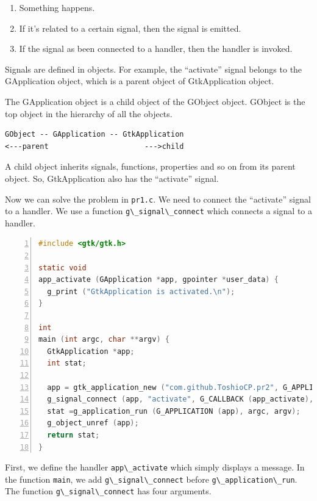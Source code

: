 \begin{enumerate}
\def\labelenumi{\arabic{enumi}.}
\tightlist
\item
  Something happens.
\item
  If it's related to a certain signal, then the signal is emitted.
\item
  If the signal as been connected to a handler, then the handler is
  invoked.
\end{enumerate}

Signals are defined in objects. For example, the ``activate'' signal
belongs to the GApplication object, which is a parent object of
GtkApplication object.

The GApplication object is a child object of the GObject object. GObject
is the top object in the hierarchy of all the objects.

\begin{lstlisting}
GObject -- GApplication -- GtkApplication
<---parent                      --->child
\end{lstlisting}

A child object inherits signals, functions, properties and so on from
its parent object. So, GtkApplication also has the ``activate'' signal.

Now we can solve the problem in \passthrough{\lstinline!pr1.c!}. We need
to connect the ``activate'' signal to a handler. We use a function
\passthrough{\lstinline!g\_signal\_connect!} which connects a signal to
a handler.

\begin{lstlisting}[language=C, numbers=left]
#include <gtk/gtk.h>

static void
app_activate (GApplication *app, gpointer *user_data) {
  g_print ("GtkApplication is activated.\n");
}

int
main (int argc, char **argv) {
  GtkApplication *app;
  int stat;

  app = gtk_application_new ("com.github.ToshioCP.pr2", G_APPLICATION_FLAGS_NONE);
  g_signal_connect (app, "activate", G_CALLBACK (app_activate), NULL);
  stat =g_application_run (G_APPLICATION (app), argc, argv);
  g_object_unref (app);
  return stat;
}
\end{lstlisting}

First, we define the handler \passthrough{\lstinline!app\_activate!}
which simply displays a message. In the function
\passthrough{\lstinline!main!}, we add
\passthrough{\lstinline!g\_signal\_connect!} before
\passthrough{\lstinline!g\_application\_run!}. The function
\passthrough{\lstinline!g\_signal\_connect!} has four arguments.

